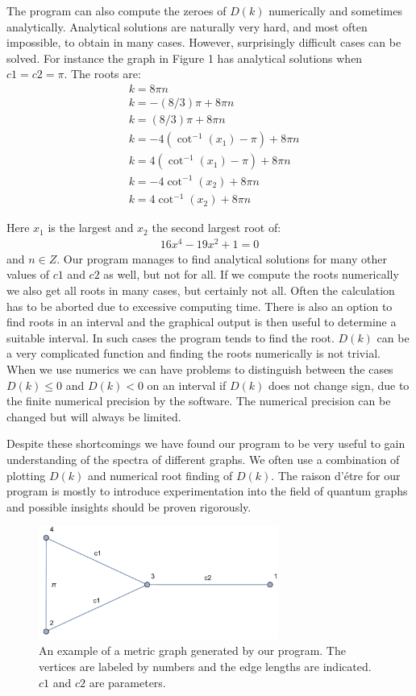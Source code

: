 \documentclass[a4paper]{article}
\begin{document}
The program can also compute the zeroes of $D(k)$ numerically and sometimes analytically. Analytical solutions are naturally very hard, and most often impossible, to obtain in many cases. However, surprisingly difficult cases can be solved. For instance the graph in Figure 1 has analytical solutions when $c1=c2=\pi$. The roots are:
\begin{align}
&k=8 \pi n \nonumber \\ 
&k= -(8/3) \pi+ 8 \pi n \nonumber \\
&k=(8/3) \pi+ 8 \pi n \nonumber \\
&k=-4 (\cot^{-1}(x_1) -\pi) + 8 \pi n \\
&k=4 (\cot^{-1}(x_1) -\pi) + 8 \pi n \nonumber \\ 
&k=-4 \cot^{-1}(x_2) + 8 \pi n \nonumber \\
&k=4 \cot^{-1}(x_2) + 8 \pi n \nonumber
\end{align}

Here $x_1$ is the largest and $x_2$ the second largest root of:
\begin{align}
16 x^4 - 19 x^2 + 1=0
\end{align}
and $n\in Z$. Our program manages to find analytical solutions for many other values of $c1$ and $c2$ as well, but not for all.
If we compute the roots numerically we also get all roots in many cases, but certainly not all. Often the calculation has to be aborted due to excessive computing time. There is also an option to find roots in an interval and the graphical output is then useful to determine a suitable interval. In such cases the program tends to find the root. $D(k)$ can be a very complicated function and finding the roots numerically is not trivial.
When we use numerics we can have problems to distinguish between the cases $D(k)\leq 0$ and $D(k) < 0$ on an interval if $D(k)$ does not change sign, due to the finite numerical precision by the software. The numerical precision can be changed but will always be limited.

Despite these shortcomings we have found our program to be very useful to gain understanding of the spectra of different graphs. We often use a combination of plotting $D(k)$ and numerical root finding of $D(k)$. The raison d'\'etre for our program is mostly to introduce experimentation into the field of quantum graphs and possible insights should be proven rigorously.
\begin{figure}
\centering
\includegraphics[width=0.7\textwidth]{graph.pdf}
\caption{\label{fig:graph}An example of a metric graph generated by our program. The vertices are labeled by numbers and the edge lengths are indicated. $c1$ and $c2$ are  parameters.}
\end{figure}
\end{document}
